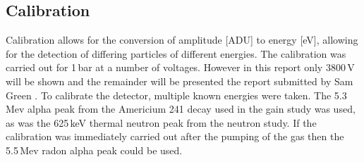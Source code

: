 \documentclass[a4paper]{article}
\begin{document}
\subsection{Calibration} \label{calib}
Calibration allows for the conversion of amplitude [ADU] to energy [eV], allowing for the detection of differing particles of different energies. The calibration was carried out for 1\,bar at a number of voltages. However in this report only 3800\,V will be shown and the remainder will be presented the report submitted by Sam Green \cite{green}. To calibrate the detector, multiple known energies were taken. The 5.3\,Mev alpha peak from the Americium 241 decay used in the gain study was used, as was the 625\,keV thermal neutron peak from the neutron study. If the calibration was immediately carried out after the pumping of the gas then the 5.5\,Mev radon alpha peak could be used. 
\end{document}
